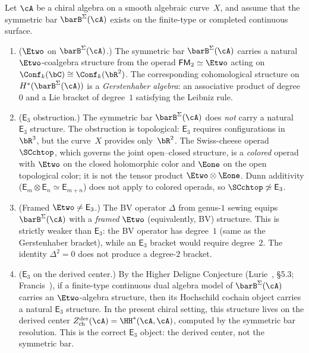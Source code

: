 \begin{proposition}
\label{prop:e3-bar-structure}
Let $\cA$ be a chiral algebra on a smooth algebraic curve~$X$, and
assume that the symmetric bar $\barB^{\Sigma}(\cA)$ exists on the
finite-type or completed continuous surface.
\begin{enumerate}[label=\textup{(\roman*)}]
\item \textup{($\Etwo$ on $\barB^{\Sigma}(\cA)$.)}
 The symmetric bar $\barB^{\Sigma}(\cA)$ carries a natural
 $\Etwo$-coalgebra
 structure from the operad $\mathsf{FM}_2 \simeq \Etwo$ acting on
 $\Conf_k(\bC) \cong \Conf_k(\bR^2)$. The corresponding cohomological
 structure on $H^*(\barB^{\Sigma}(\cA))$ is a \emph{Gerstenhaber algebra}: an
 associative product of degree~$0$ and a Lie bracket of degree~$1$
 satisfying the Leibniz rule.

\item \textup{($\mathsf{E}_3$ obstruction.)}
 The symmetric bar $\barB^{\Sigma}(\cA)$ does \emph{not} carry a natural
 $\mathsf{E}_3$ structure. The obstruction is topological:
 $\mathsf{E}_3$ requires configurations in~$\bR^3$, but the
 curve~$X$ provides only~$\bR^2$. The
 Swiss-cheese operad $\SCchtop$, which governs the
 joint open--closed structure, is a \emph{colored} operad
 with $\Etwo$ on the closed holomorphic color and $\Eone$ on the
 open topological color;
 it is not the tensor product $\Etwo \otimes \Eone$.
 Dunn additivity
 \textup{(}$\mathsf{E}_m \otimes \mathsf{E}_n \simeq \mathsf{E}_{m+n}$\textup{)}
 does not apply to colored operads, so
 $\SCchtop \not\simeq \mathsf{E}_3$.

\item \textup{(Framed $\Etwo \neq \mathsf{E}_3$.)}
 The BV operator $\Delta$ from genus-$1$ sewing equips
 $\barB^{\Sigma}(\cA)$
 with a \emph{framed} $\Etwo$ \textup{(}equivalently, BV\textup{)}
 structure. This is strictly weaker than $\mathsf{E}_3$:
 the BV operator has degree~$1$ \textup{(}same as the Gerstenhaber
 bracket\textup{)}, while an $\mathsf{E}_3$ bracket would require
 degree~$2$. The identity $\Delta^2 = 0$ does not produce a
 degree-$2$ bracket.

\item \textup{($\mathsf{E}_3$ on the derived center.)}
 By the Higher Deligne Conjecture
 \textup{(}Lurie~\cite{HA}, \S5.3; Francis~\cite{Francis2013}\textup{)},
 if a finite-type continuous dual algebra model of
 $\barB^{\Sigma}(\cA)$ carries an $\Etwo$-algebra structure, then
 its Hochschild cochain object carries a natural $\mathsf{E}_3$
 structure. In the present chiral setting, this structure lives on
 the derived center
 $Z^{\mathrm{der}}_{\mathrm{ch}}(\cA) = \HH^*(\cA,\cA)$, computed by the
 symmetric bar resolution. This is the correct $\mathsf{E}_3$ object:
 the derived center, not the symmetric bar.


\end{enumerate}
\end{proposition}
